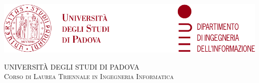 \begin{titlingpage}
    \centering
    \includegraphics{assets/icons/header} \vspace{2cm}

    {
        {\Huge\alt UNIVERSIT\`A DEGLI STUDI DI PADOVA}\\[.5cm]
        {\scshape\large\hspace*{1mm} Corso di Laurea Triennale in Ingegneria Informatica}
    }

    \vspace{2cm}


\end{titlingpage}
